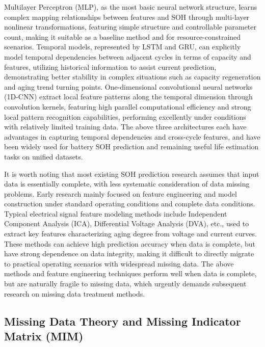 \documentclass[5p,times]{elsarticle}
\begin{document}
Multilayer Perceptron (MLP), as the most basic neural network structure, learns complex mapping relationships between features and SOH through multi-layer nonlinear transformations, featuring simple structure and controllable parameter count, making it suitable as a baseline method and for resource-constrained scenarios\cite{bairwa2025cycle}. Temporal models, represented by LSTM and GRU, can explicitly model temporal dependencies between adjacent cycles in terms of capacity and features, utilizing historical information to assist current prediction\cite{hochreiter1997lstm,cho2014gru}, demonstrating better stability in complex situations such as capacity regeneration and aging trend turning points. One-dimensional convolutional neural networks (1D-CNN) extract local feature patterns along the temporal dimension through convolution kernels, featuring high parallel computational efficiency and strong local pattern recognition capabilities\cite{lecun2015cnn}, performing excellently under conditions with relatively limited training data\cite{zhang2024cnnsoh}. The above three architectures each have advantages in capturing temporal dependencies and cross-cycle features, and have been widely used for battery SOH prediction and remaining useful life estimation tasks on unified datasets\cite{bairwa2025cycle}.

It is worth noting that most existing SOH prediction research assumes that input data is essentially complete, with less systematic consideration of data missing problems\cite{shao2025soh,deng2025novel}. Early research mainly focused on feature engineering and model construction under standard operating conditions and complete data conditions. Typical electrical signal feature modeling methods include Independent Component Analysis (ICA), Differential Voltage Analysis (DVA), etc., used to extract key features characterizing aging degree from voltage and current curves\cite{deng2025novel}. These methods can achieve high prediction accuracy when data is complete, but have strong dependence on data integrity, making it difficult to directly migrate to practical operating scenarios with widespread missing data. The above methods and feature engineering techniques perform well when data is complete, but are naturally fragile to missing data, which urgently demands subsequent research on missing data treatment methods.

\subsection{Missing Data Theory and Missing Indicator Matrix (MIM)}
\end{document}
